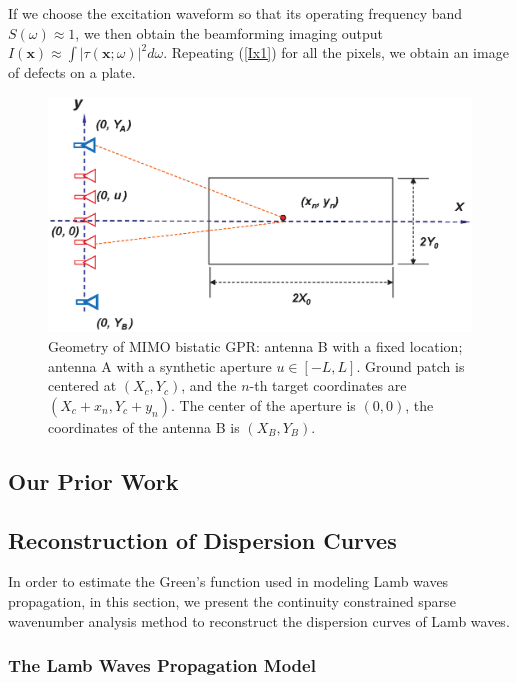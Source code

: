 \documentclass{article}
\begin{document}
If we choose the excitation waveform so that its operating frequency band $S(\omega) \approx 1$, we then obtain the beamforming imaging output $I(\mathbf{x}) \approx \int \left| \tau(\mathbf{x}; \omega) \right|^2 d\omega$. Repeating (\ref{Ix1}) for all the pixels, we obtain an image of defects on a plate. 








\begin{figure}
\centering
\includegraphics[bb = 0 350 494 638, clip, scale=0.45]{Geometry.eps}
\caption{Geometry of MIMO bistatic GPR: antenna B with a
fixed location; antenna A with a synthetic aperture $u \in
[-L,L]$. Ground patch is centered at $(X_c, Y_c)$, and the $n$-th
target coordinates are $(X_c+x_n, Y_c+y_n)$. The center of the
aperture is $(0,0)$, the coordinates of the antenna B is
$(X_B,Y_B)$. } \label{figA}
\end{figure}
\subsection{Our Prior Work}

\cite{JinmouraICASSP07}

\subsection{Reconstruction of Dispersion Curves}
In order to estimate the Green's function used in modeling Lamb waves propagation, in this section, we present the continuity constrained sparse wavenumber analysis method to reconstruct the dispersion curves of Lamb waves. 
\subsubsection{The Lamb Waves Propagation Model}
\end{document}
